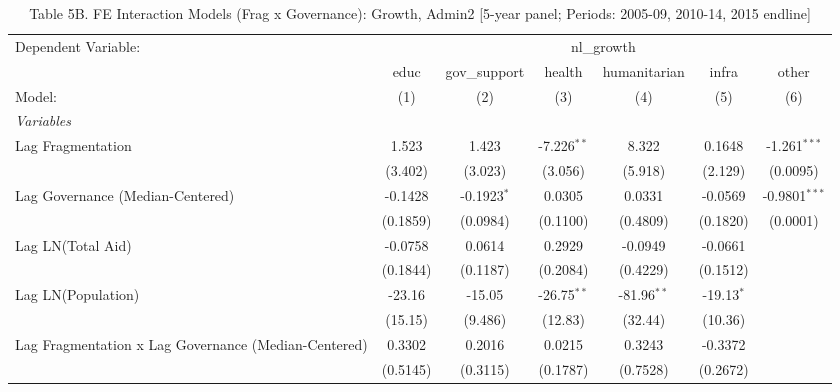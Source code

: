 
\begin{table}[H]
   \caption{Table 5B. FE Interaction Models (Frag x Governance): Growth, Admin2 [5-year panel; Periods: 2005-09, 2010-14, 2015 endline]}
   \centering
   \begin{tabular}{lcccccc}
      \tabularnewline \midrule \midrule
      Dependent Variable: & \multicolumn{6}{c}{nl\_growth}\\
                                                           & educ     & gov\_support  & health        & humanitarian  & infra        & other \\   
      Model:                                               & (1)      & (2)           & (3)           & (4)           & (5)          & (6)\\  
      \midrule
      \emph{Variables}\\
      Lag Fragmentation                                    & 1.523    & 1.423         & -7.226$^{**}$ & 8.322         & 0.1648       & -1.261$^{***}$\\   
                                                           & (3.402)  & (3.023)       & (3.056)       & (5.918)       & (2.129)      & (0.0095)\\   
      Lag Governance (Median-Centered)                     & -0.1428  & -0.1923$^{*}$ & 0.0305        & 0.0331        & -0.0569      & -0.9801$^{***}$\\   
                                                           & (0.1859) & (0.0984)      & (0.1100)      & (0.4809)      & (0.1820)     & (0.0001)\\   
      Lag LN(Total Aid)                                    & -0.0758  & 0.0614        & 0.2929        & -0.0949       & -0.0661      &   \\   
                                                           & (0.1844) & (0.1187)      & (0.2084)      & (0.4229)      & (0.1512)     &   \\   
      Lag LN(Population)                                   & -23.16   & -15.05        & -26.75$^{**}$ & -81.96$^{**}$ & -19.13$^{*}$ &   \\   
                                                           & (15.15)  & (9.486)       & (12.83)       & (32.44)       & (10.36)      &   \\   
      Lag Fragmentation x Lag Governance (Median-Centered) & 0.3302   & 0.2016        & 0.0215        & 0.3243        & -0.3372      &   \\   
                                                           & (0.5145) & (0.3115)      & (0.1787)      & (0.7528)      & (0.2672)     &   \\   

\end{tabular}
\end{table}
